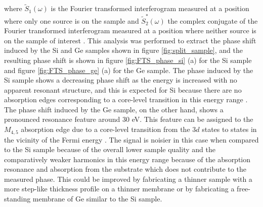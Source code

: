 where $\tilde{S}_{1}(\omega)$ is the Fourier transformed interferogram measured at a position where only one source is on the sample and $\tilde{S}_{2}^{\ast}(\omega)$ the complex conjugate of the Fourier transformed interferogram measured at a position where neither source is on the sample of interest \cite{jansenBroadbandExtremeUltraviolet2019}.  This analysis was performed to extract the phase shift induced by the Si and Ge samples shown in figure \ref{fig:split_sample}, and the resulting phase shift is shown in figure \ref{fig:FTS_phase_si} (a) for the Si sample and figure \ref{fig:FTS_phase_ge} (a) for the Ge sample.  The phase induced by the Si sample shows a decreasing phase shift as the energy is increased with no apparent resonant structure, and this is expected for Si because there are no absorption edges corresponding to a core-level transition in this energy range \cite{henkeXRayInteractionsPhotoabsorption1993}.  The phase shift induced by the Ge sample, on the other hand, shows a pronounced resonance feature around 30 eV.  This feature can be assigned to the $M_{4,5}$ absorption edge due to a core-level transition from the $3d$ states to states in the vicinity of the Fermi energy \cite{henkeXRayInteractionsPhotoabsorption1993, kaplanRetrievalComplexvaluedRefractive2019, borjaExtremeUltravioletTransient2016, krausAttosecondTransientReflectivity2016, zurchDirectSimultaneousObservation2017, zurchUltrafastCarrierThermalization2017}. The signal is noisier in this case when compared to the Si sample because of the overall lower sample quality and the comparatively weaker harmonics in this energy range because of the absorption resonance and absorption from the substrate which does not contribute to the measured phase.  This could be improved by fabricating a thinner sample with a more step-like thickness profile on a thinner membrane or by fabricating a free-standing membrane of Ge similar to the Si sample.


